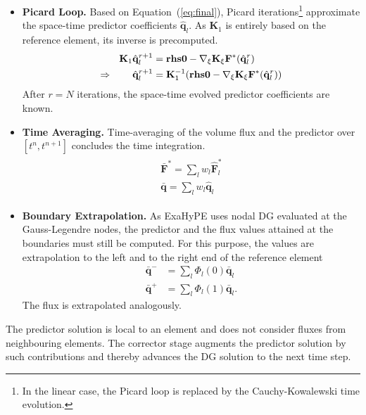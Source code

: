 \documentclass{acm_proc_article-sp}
\begin{document}
\begin{itemize}
\item \textbf{Picard Loop.} Based on Equation~(\ref{eq:final}), Picard iterations\footnote{In the linear case, the Picard loop is replaced by the Cauchy-Kowalewski time evolution.} approximate the space-time predictor coefficients $\hat{\mathbf{q}}_l$. As $\mathbf{K}_1$ is entirely based on the reference element, its inverse is precomputed.
\begin{align*}
  \mathbf{K}_1 \hat{\mathbf{q}}^{r+1}_l &= \text{\textbf{rhs0}} - \nabla_{\mathbf{\xi}} \mathbf{K}_\xi \mathbf{F}^*(\hat{\mathbf{q}}_l^r) \\
  \Rightarrow \qquad \hat{\mathbf{q}}^{r+1}_l &= \mathbf{K}_1^{-1} (\text{\textbf{rhs0}} - \nabla_{\mathbf{\xi}} \mathbf{K}_\xi \mathbf{F}^*(\hat{\mathbf{q}}_l^r))
\end{align*}
After $r=N$ iterations, the space-time evolved predictor coefficients are known.

\item \textbf{Time Averaging.} Time-averaging of the volume flux and the predictor over $[t^n, t^{n+1}]$ concludes the time integration.
\begin{align}\label{eq:timeaveraging}
\begin{split}
\bar{\mathbf{F}}^* = \sum \limits_{l} w_l \hat{\mathbf{F}}^*_l\\
\bar{\mathbf{q}} = \sum \limits_{l} w_l \hat{\mathbf{q}}_l
\end{split}
\end{align}

\item \textbf{Boundary Extrapolation.} As ExaHyPE uses nodal DG evaluated at the Gauss-Legendre nodes, the predictor and the flux values attained at the boundaries must still be computed. For this purpose, the values are extrapolation to the left and to the right end of the reference element 
\begin{align*}
\bar{\mathbf{q}}^- &= \sum \limits_l \Phi_l(0) \bar{\mathbf{q}}_l\\
\bar{\mathbf{q}}^+ &= \sum \limits_l \Phi_l(1) \bar{\mathbf{q}}_l.
\end{align*}
The flux is extrapolated analogously.
\end{itemize}
The predictor solution is local to an element and does not consider fluxes from neighbouring elements. The corrector stage augments the predictor solution by such contributions and thereby advances the DG solution to the next time step.
\end{document}
